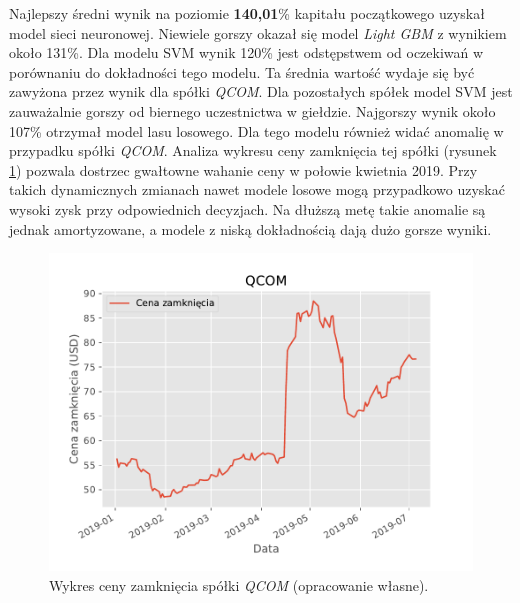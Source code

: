 \documentclass[a4paper, twoside, 11pt, openright]{article}
\begin{document}
Najlepszy średni wynik na poziomie \textbf{140,01}\% kapitału początkowego uzyskał model sieci neuronowej. Niewiele gorszy okazał się model \textit{Light GBM} z wynikiem około 131\%. Dla modelu SVM wynik 120\% jest odstępstwem od oczekiwań w porównaniu do dokładności tego modelu. Ta średnia wartość wydaje się być zawyżona przez wynik dla spółki \textit{QCOM}. Dla pozostałych spółek model SVM jest zauważalnie gorszy od biernego uczestnictwa w giełdzie. Najgorszy wynik około 107\% otrzymał model lasu losowego. Dla tego modelu również widać anomalię w przypadku spółki \textit{QCOM}. Analiza wykresu ceny zamknięcia tej spółki (rysunek \ref{img:qcom_adj_close}) pozwala dostrzec gwałtowne wahanie ceny w połowie kwietnia 2019. Przy takich dynamicznych zmianach nawet modele losowe mogą przypadkowo uzyskać wysoki zysk przy odpowiednich decyzjach. Na dłuższą metę takie anomalie są jednak amortyzowane, a modele z niską dokładnością dają dużo gorsze wyniki.

\begin{figure}[H]
\centering \includegraphics[scale=1]{img/QCOM_adj_close.pdf}
\caption{Wykres ceny zamknięcia spółki \textit{QCOM} (opracowanie własne).}
\label{img:qcom_adj_close}
\end{figure}
\end{document}
